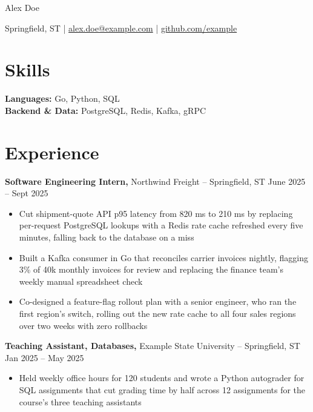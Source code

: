 \documentclass[11pt]{article}       %
\begin{document}
\centerline{\Huge Alex Doe}

\vspace{5pt}

\centerline{Springfield, ST | \href{mailto:alex.doe@example.com}{alex.doe@example.com} | \href{https://github.com/example}{github.com/example}}

\vspace{-10pt}

\section*{Skills}
\textbf{Languages:} Go, Python, SQL \\
\textbf{Backend \& Data:} PostgreSQL, Redis, Kafka, gRPC

\vspace{-6.5pt}

\section*{Experience}
\textbf{Software Engineering Intern,} Northwind Freight -- Springfield, ST \hfill June 2025 -- Sept 2025 \\
\vspace{-9pt}
\begin{itemize}
  \item Cut shipment-quote API p95 latency from 820 ms to 210 ms by replacing per-request PostgreSQL lookups with a Redis rate cache refreshed every five minutes, falling back to the database on a miss
  \item Built a Kafka consumer in Go that reconciles carrier invoices nightly, flagging 3\% of 40k monthly invoices for review and replacing the finance team's weekly manual spreadsheet check
  \item Co-designed a feature-flag rollout plan with a senior engineer, who ran the first region's switch, rolling out the new rate cache to all four sales regions over two weeks with zero rollbacks
\end{itemize}

\textbf{Teaching Assistant, Databases,} Example State University -- Springfield, ST \hfill Jan 2025 -- May 2025 \\
\vspace{-9pt}
\begin{itemize}
  \item Held weekly office hours for 120 students and wrote a Python autograder for SQL assignments that cut grading time by half across 12 assignments for the course's three teaching assistants
\end{itemize}
\end{document}
